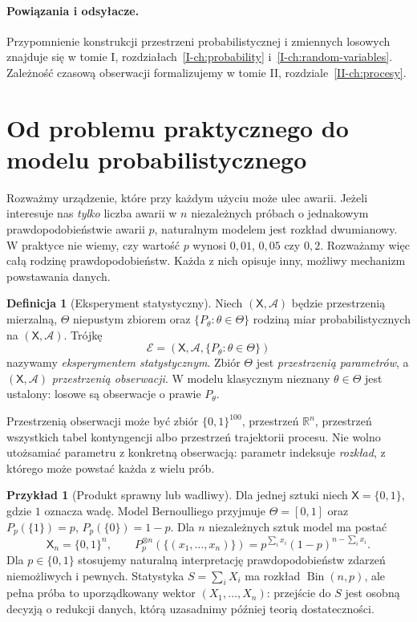 \documentclass[11pt,a4paper,oneside]{report}
\numberwithin{equation}{chapter}
\theoremstyle{plain}
\theoremstyle{definition}
\newtheorem{definicja}{Definicja}[chapter]
\newtheorem{przyklad}{Przykład}[chapter]
\theoremstyle{remark}
\newcommand{\R}{\mathbb R}
\newcommand{\calA}{\mathcal A}
\DeclareMathOperator{\Bin}{Bin}
\begin{document}
\paragraph{Powiązania i odsyłacze.} Przypomnienie konstrukcji przestrzeni probabilistycznej i zmiennych losowych znajduje się w tomie I, rozdziałach~\ref{I-ch:probability} i~\ref{I-ch:random-variables}. Zależność czasową obserwacji formalizujemy w tomie II, rozdziale~\ref{II-ch:procesy}.

\section{Od problemu praktycznego do modelu probabilistycznego}
Rozważmy urządzenie, które przy każdym użyciu może ulec awarii. Jeżeli interesuje nas \emph{tylko} liczba awarii w $n$ niezależnych próbach o jednakowym prawdopodobieństwie awarii $p$, naturalnym modelem jest rozkład dwumianowy. W praktyce nie wiemy, czy wartość $p$ wynosi $0{,}01$, $0{,}05$ czy $0{,}2$. Rozważamy więc całą rodzinę prawdopodobieństw. Każda z nich opisuje inny, możliwy mechanizm powstawania danych.

\begin{definicja}[Eksperyment statystyczny]\label{def:eksperyment}
Niech $(\mathsf X,\calA)$ będzie przestrzenią mierzalną, $\Theta$ niepustym zbiorem oraz $\{P_\theta:\theta\in\Theta\}$ rodziną miar probabilistycznych na $(\mathsf X,\calA)$. Trójkę
\[
\mathcal E=(\mathsf X,\calA,\{P_\theta:\theta\in\Theta\})
\]
nazywamy \emph{eksperymentem statystycznym}. Zbiór $\Theta$ jest \emph{przestrzenią parametrów}, a $(\mathsf X,\calA)$ \emph{przestrzenią obserwacji}. W modelu klasycznym nieznany $\theta\in\Theta$ jest ustalony: losowe są obserwacje o prawie $P_\theta$.
\end{definicja}

Przestrzenią obserwacji może być zbiór $\{0,1\}^{100}$, przestrzeń $\R^n$, przestrzeń wszystkich tabel kontyngencji albo przestrzeń trajektorii procesu. Nie wolno utożsamiać parametru z konkretną obserwacją: parametr indeksuje \emph{rozkład}, z którego może powstać każda z wielu prób.

\begin{przyklad}[Produkt sprawny lub wadliwy]\label{ex:bernoulli-exp}
Dla jednej sztuki niech $\mathsf X=\{0,1\}$, gdzie $1$ oznacza wadę. Model Bernoulliego przyjmuje $\Theta=[0,1]$ oraz $P_p(\{1\})=p$, $P_p(\{0\})=1-p$. Dla $n$ niezależnych sztuk model ma postać
\[
\mathsf X_n=\{0,1\}^n,\qquad
P_p^{\otimes n}(\{(x_1,\ldots,x_n)\})=p^{\sum_i x_i}(1-p)^{n-\sum_i x_i}.
\]
Dla $p\in\{0,1\}$ stosujemy naturalną interpretację prawdopodobieństw zdarzeń niemożliwych i pewnych. Statystyka $S=\sum_iX_i$ ma rozkład $\Bin(n,p)$, ale pełna próba to uporządkowany wektor $(X_1,\ldots,X_n)$: przejście do $S$ jest osobną decyzją o redukcji danych, którą uzasadnimy później teorią dostateczności.
\end{przyklad}
\end{document}
